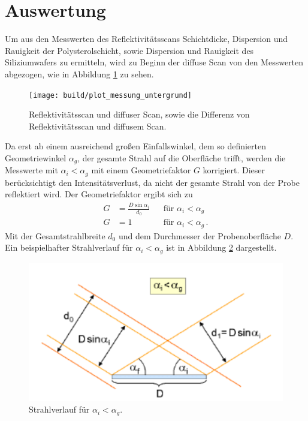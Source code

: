 \newpage
\section{Auswertung}
\label{sec:Auswertung}
Um aus den Messwerten des Reflektivitätsscans Schichtdicke, Dispersion
und Rauigkeit der Polysterolschicht, sowie Dispersion und Rauigkeit des Siliziumwafers
zu ermitteln, wird
zu Beginn der diffuse Scan von den Messwerten abgezogen, wie in Abbildung
\ref{fig:diffuse_Scan} zu sehen.

\begin{figure}
  \centering
  \texttt{[image: build/plot\_messung\_untergrund]}
  \caption{Reflektivitätsscan und diffuser Scan, sowie die Differenz von Reflektivitätsscan und diffusem Scan.}
  \label{fig:diffuse_Scan}
\end{figure}

Da erst ab einem ausreichend großen Einfallswinkel,
dem so definierten Geometriewinkel $\alpha_g$,
der gesamte Strahl auf die Oberfläche trifft,
werden die Messwerte mit $\alpha_i < \alpha_g$
mit einem Geometriefaktor $G$ korrigiert.
Dieser berücksichtigt den Intensitätsverlust, da
nicht der gesamte Strahl von der Probe reflektiert wird.
Der Geometriefaktor ergibt sich zu
\begin{align}
G&=\frac{D\sin\alpha_i}{d_0} &  &\text{für } \alpha_i<\alpha_g \label{eqn:GEO}\\
G&=1 & &\text{für } \alpha_i<\alpha_g \, .
\end{align}
Mit der Gesamtstrahlbreite $d_0$ und dem Durchmesser der Probenoberfläche $D$.
Ein beispielhafter Strahlverlauf für $\alpha_i<\alpha_g$ ist in Abbildung \ref{fig:geo}
dargestellt.
\begin{figure}
  \centering
  \includegraphics{bilder/geo_winkel.PNG}
  \caption{Strahlverlauf für $\alpha_i<\alpha_g$. \cite{sample}}
  \label{fig:geo}
\end{figure}

